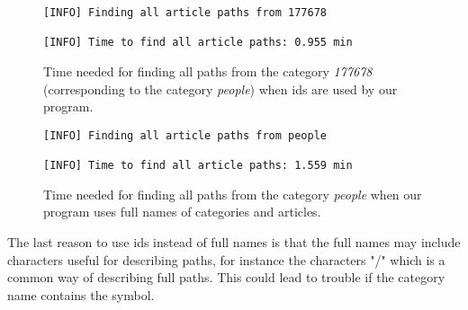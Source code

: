 \begin{figure}[h]
\centering
\begin{lstlisting}
[INFO] Finding all article paths from 177678

[INFO] Time to find all article paths: 0.955 min
\end{lstlisting}
\caption[Time for all paths for \emph{people} when using ids]{Time needed for finding all paths from the category \emph{177678} (corresponding to the category \emph{people}) when ids are used by our program.}
\label{fig:id_lookup}
\end{figure}


\begin{figure}[h]
\centering
\begin{lstlisting}
[INFO] Finding all article paths from people

[INFO] Time to find all article paths: 1.559 min
\end{lstlisting}
\caption[Time for all paths for \emph{people} when using full names]{Time needed for finding all paths from the category \emph{people} when our program uses full names of categories and articles.}
\label{fig:fullname_lookup}
\end{figure}
 
The last reason to use ids instead of full names is that the full names may include characters useful for describing paths, for instance the characters "/" which is a common way of describing full paths. This could lead to trouble if the category name contains the symbol. 


